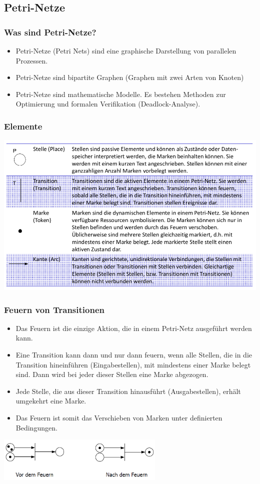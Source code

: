 \subsection{Petri-Netze}
\subsubsection{Was sind Petri-Netze?}
\begin{itemize}
\item Petri-Netze (Petri Nets) sind eine graphische Darstellung von parallelen Prozessen.
\item Petri-Netze sind bipartite Graphen (Graphen mit zwei Arten von Knoten)
\item Petri-Netze sind mathematische Modelle. Es bestehen Methoden zur
Optimierung und formalen Verifikation (Deadlock-Analyse).
\end{itemize}
\subsubsection{Elemente}
\includegraphics[width=15cm]{images/Concurrency/PetriNetzeElemente}
\newpage
\subsubsection{Feuern von Transitionen}
\begin{itemize}
\item Das Feuern ist die einzige Aktion, die in einem Petri-Netz ausgeführt werden kann.
\item Eine Transition kann dann und nur dann feuern, wenn alle Stellen, die in die Transition hineinführen (Eingabestellen), mit mindestens einer Marke belegt sind. Dann wird bei jeder dieser Stellen eine Marke abgezogen.
\item Jede Stelle, die aus
dieser Transition hinausführt (Ausgabestellen), erhält umgekehrt eine Marke.
\item Das Feuern ist somit das Verschieben von Marken unter definierten Bedingungen.
\end{itemize}
\includegraphics[width=8cm]{images/Concurrency/Petri1}

